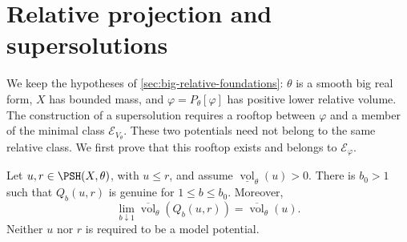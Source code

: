 \section{Relative projection and supersolutions}
\label{sec:big-relative-projection}

We keep the hypotheses of \cref{sec:big-relative-foundations}: $\theta$ is a smooth big real form, $X$ has bounded mass, and $\varphi=P_\theta[\varphi]$ has positive lower relative volume. The construction of a supersolution requires a rooftop between $\varphi$ and a member of the minimal class $\mathcal E_{V_\theta}$. These two potentials need not belong to the same relative class. We first prove that this rooftop exists and belongs to $\mathcal E_\varphi$.

\begin{lemma}\label{lem:positive-volume-stretch}
Let $u,r\in\PSH(X,\theta)$, with $u\leq r$, and assume
$\underline{\operatorname{vol}}_\theta(u)>0$. There is $b_0>1$ such that $Q_b(u,r)$ is genuine for $1\leq b\leq b_0$. Moreover,
\[
 \lim_{b\downarrow1}\overline{\operatorname{vol}}_\theta(Q_b(u,r))
 =\overline{\operatorname{vol}}_\theta(u).
\]
Neither $u$ nor $r$ is required to be a model potential.
\end{lemma}
